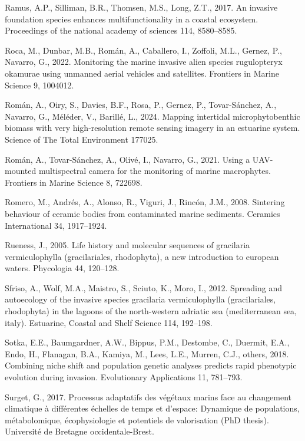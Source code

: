 \documentclass[
  letterpaper,
  DIV=11,
  numbers=noendperiod]{scrartcl}
\newlength{\cslhangindent}
\newenvironment{CSLReferences}[2] %
 {\begin{list}{}{%
  \setlength{\itemindent}{0pt}
  \setlength{\leftmargin}{0pt}
  \setlength{\parsep}{0pt}
  \ifodd #1
   \setlength{\leftmargin}{\cslhangindent}
   \setlength{\itemindent}{-1\cslhangindent}
  \fi
  \setlength{\itemsep}{#2\baselineskip}}}
 {\end{list}}
\begin{document}
\begin{CSLReferences}{1}{0}
Ramus, A.P., Silliman, B.R., Thomsen, M.S., Long, Z.T., 2017. An
invasive foundation species enhances multifunctionality in a coastal
ecosystem. Proceedings of the national academy of sciences 114,
8580--8585.

Roca, M., Dunbar, M.B., Román, A., Caballero, I., Zoffoli, M.L., Gernez,
P., Navarro, G., 2022. Monitoring the marine invasive alien species
rugulopteryx okamurae using unmanned aerial vehicles and satellites.
Frontiers in Marine Science 9, 1004012.

Román, A., Oiry, S., Davies, B.F., Rosa, P., Gernez, P., Tovar-Sánchez,
A., Navarro, G., Méléder, V., Barillé, L., 2024. Mapping intertidal
microphytobenthic biomass with very high-resolution remote sensing
imagery in an estuarine system. Science of The Total Environment 177025.

Román, A., Tovar-Sánchez, A., Olivé, I., Navarro, G., 2021. Using a
UAV-mounted multispectral camera for the monitoring of marine
macrophytes. Frontiers in Marine Science 8, 722698.

Romero, M., Andrés, A., Alonso, R., Viguri, J., Rincón, J.M., 2008.
Sintering behaviour of ceramic bodies from contaminated marine
sediments. Ceramics International 34, 1917--1924.

Rueness, J., 2005. Life history and molecular sequences of gracilaria
vermiculophylla (gracilariales, rhodophyta), a new introduction to
european waters. Phycologia 44, 120--128.

Sfriso, A., Wolf, M.A., Maistro, S., Sciuto, K., Moro, I., 2012.
Spreading and autoecology of the invasive species gracilaria
vermiculophylla (gracilariales, rhodophyta) in the lagoons of the
north-western adriatic sea (mediterranean sea, italy). Estuarine,
Coastal and Shelf Science 114, 192--198.

Sotka, E.E., Baumgardner, A.W., Bippus, P.M., Destombe, C., Duermit,
E.A., Endo, H., Flanagan, B.A., Kamiya, M., Lees, L.E., Murren, C.J.,
others, 2018. Combining niche shift and population genetic analyses
predicts rapid phenotypic evolution during invasion. Evolutionary
Applications 11, 781--793.

Surget, G., 2017. Processus adaptatifs des v{é}g{é}taux marins face au
changement climatique {à} diff{é}rentes {é}chelles de temps et d'espace:
Dynamique de populations, m{é}tabolomique, {é}cophysiologie et
potentiels de valorisation (PhD thesis). Universit{é} de Bretagne
occidentale-Brest.


\end{CSLReferences}
\end{document}
